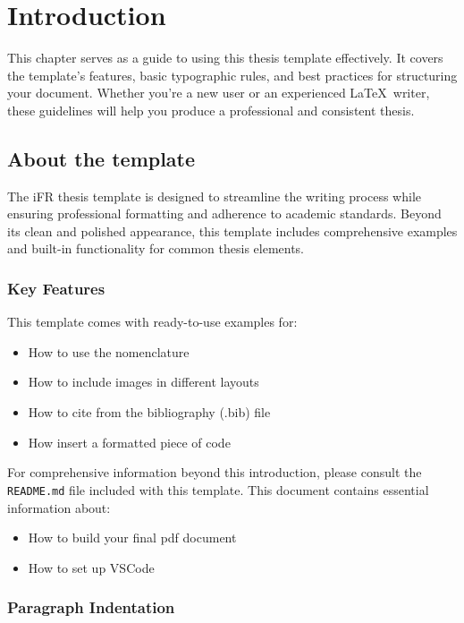 \chapter{Introduction}%
\label{chap:intro}

This chapter serves as a guide to using this thesis template effectively. It covers the template's features, basic typographic rules, and best practices for structuring your document. Whether you're a new user or an experienced \LaTeX\ writer, these guidelines will help you produce a professional and consistent thesis.

\section{About the template}
\label{sec:about}

The iFR thesis template is designed to streamline the writing process while ensuring professional formatting and adherence to academic standards. Beyond its clean and polished appearance, this template includes comprehensive examples and built-in functionality for common thesis elements.

\subsection{Key Features}
\label{subsec:features}

This template comes with ready-to-use examples for:
\begin{itemize}
    \item How to use the nomenclature
    \item How to include images in different layouts
    \item How to cite from the bibliography (.bib) file
    \item How insert a formatted piece of code
\end{itemize}

For comprehensive information beyond this introduction, please consult the \texttt{README.md} file included with this template. This document contains essential information about:
\begin{itemize}
    \item How to build your final pdf document
    \item How to set up VSCode
\end{itemize}

\subsection{Paragraph Indentation}
\label{subsec:indentation}

